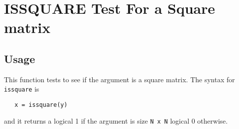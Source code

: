\section{ISSQUARE Test For a Square matrix}

\subsection{Usage}

This function tests to see if the argument is a square matrix.  The 
syntax for \verb|issquare| is
\begin{verbatim}
   x = issquare(y)
\end{verbatim}
and it returns a logical 1 if the argument is size \verb|N x N|
logical 0 otherwise.
